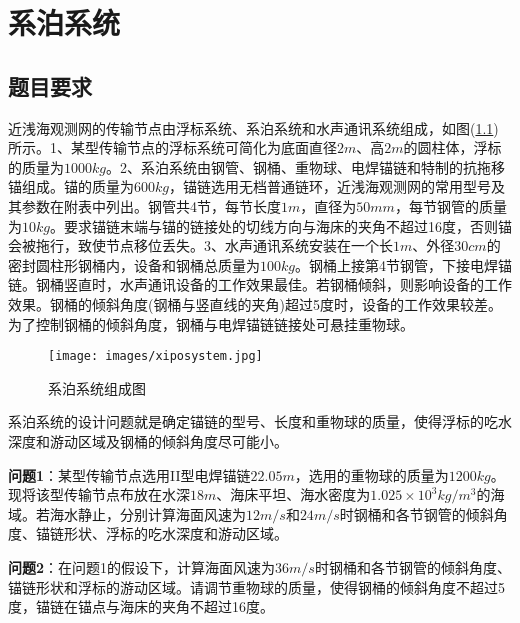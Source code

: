 
\chapter{系泊系统}
\section{题目要求}
    \par
    近浅海观测网的传输节点由浮标系统、系泊系统和水声通讯系统组成，如图(\ref{fig:系泊系统组成图})所示。1、某型传输节点的浮标系统可简化为底面直径$2m$、高$2m$的圆柱体，浮标的质量为$1000kg$。2、系泊系统由钢管、钢桶、重物球、电焊锚链和特制的抗拖移锚组成。锚的质量为$600kg$，锚链选用无档普通链环，近浅海观测网的常用型号及其参数在附表中列出。钢管共4节，每节长度$1m$，直径为$50mm$，每节钢管的质量为$10kg$。要求锚链末端与锚的链接处的切线方向与海床的夹角不超过16度，否则锚会被拖行，致使节点移位丢失。3、水声通讯系统安装在一个长$1m$、外径$30cm$的密封圆柱形钢桶内，设备和钢桶总质量为$100kg$。钢桶上接第4节钢管，下接电焊锚链。钢桶竖直时，水声通讯设备的工作效果最佳。若钢桶倾斜，则影响设备的工作效果。钢桶的倾斜角度(钢桶与竖直线的夹角)超过5度时，设备的工作效果较差。为了控制钢桶的倾斜角度，钢桶与电焊锚链链接处可悬挂重物球。
            \begin{figure}[H]
            \centering
            \texttt{[image: images/xiposystem.jpg]}
            \caption{系泊系统组成图}
            \label{fig:系泊系统组成图}
            \end{figure}
    \par
    系泊系统的设计问题就是确定锚链的型号、长度和重物球的质量，使得浮标的吃水深度和游动区域及钢桶的倾斜角度尽可能小。
    \par
    \textbf{问题1}：某型传输节点选用II型电焊锚链$22.05m$，选用的重物球的质量为$1200kg$。现将该型传输节点布放在水深$18m$、海床平坦、海水密度为$1.025\times 10^3kg/m^3$的海域。若海水静止，分别计算海面风速为$12m/s$和$24m/s$时钢桶和各节钢管的倾斜角度、锚链形状、浮标的吃水深度和游动区域。
    \par
    \textbf{问题2}：在问题1的假设下，计算海面风速为$36m/s$时钢桶和各节钢管的倾斜角度、锚链形状和浮标的游动区域。请调节重物球的质量，使得钢桶的倾斜角度不超过5度，锚链在锚点与海床的夹角不超过16度。
